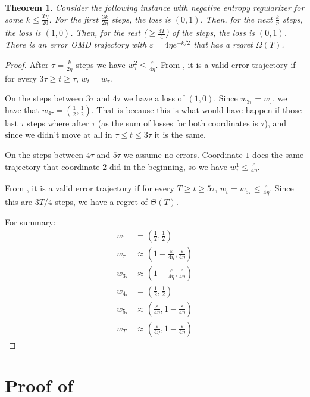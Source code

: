 \documentclass[10pt]{article}
\newtheorem{theorem}{Theorem}
\theoremstyle{definition}
\theoremstyle{remark}
\renewcommand{\epsilon}{\varepsilon}
\newcommand{\roundy}[1]{ {\left( #1 \right)}}
\begin{document}
\begin{theorem}
Consider the following instance with negative entropy regularizer for some $k\le\frac{T\eta}{20}$. For the first $\frac{3k}{2\eta}$ steps, the loss is $(0,1)$. Then, for the next $\frac{k}{\eta}$ steps, the loss is $(1,0)$. Then, for the rest ($\ge \frac{3T}{4}$) of the steps, the loss is $(0,1)$. There is an error OMD trajectory with $\epsilon=4\eta e^{-k/2}$ that has a regret $\Omega(T)$.
\end{theorem}
\begin{proof}
After $\tau=\frac{k}{2\eta}$ steps we have $w_\tau^2 \le \frac{\epsilon}{4\eta}$. From , it is a valid error trajectory if for every $3\tau \ge t\ge\tau$, $w_t =w_\tau$. 

On the steps between $3\tau$ and $4\tau$ we have a loss of $(1,0)$. Since $w_{3\tau}=w_\tau$, we have that $w_{4\tau} = \roundy{\frac{1}{2}, \frac{1}{2}}$. That is because this is what would have happen if those last $\tau$ steps where after $\tau$ (as the sum of losses for both coordinates is $\tau$), and since we didn't move at all in $\tau\le t\le 3\tau$ it is the same.

On the steps between $4\tau$ and $5\tau$ we assume no errors. Coordinate $1$ does the same trajectory that coordinate $2$ did in the beginning, so we have $w_\tau^1\le\frac{\epsilon}{4\eta}$. 

From , it is a valid error trajectory if for every $T \ge t\ge5\tau$, $w_t =w_{5\tau} \le \frac{\epsilon}{4\eta}$. Since this are $3T/4$ steps, we have a regret of $\Theta(T)$.

For summary:
\begin{align*}
    w_1 &= \roundy{\frac{1}{2}, \frac{1}{2}} \\
    w_\tau &\approx \roundy{1-\frac{\epsilon}{4\eta}, \frac{\epsilon}{4\eta}} \\
    w_{3\tau} &\approx \roundy{1-\frac{\epsilon}{4\eta}, \frac{\epsilon}{4\eta}} \\
    w_{4\tau} &= \roundy{\frac{1}{2}, \frac{1}{2}} \\
    w_{5\tau} &\approx \roundy{\frac{\epsilon}{4\eta}, 1-\frac{\epsilon}{4\eta}} \\
    w_T &\approx \roundy{\frac{\epsilon}{4\eta}, 1-\frac{\epsilon}{4\eta}}
\end{align*}
\end{proof}

\section{Proof of }\label{sec:simplex upper bound}
\end{document}
